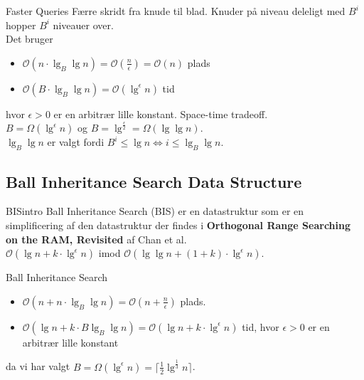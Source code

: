 \documentclass[pdf]{beamer}
\begin{document}
\begin{frame}{Faster Queries}
  Færre skridt fra knude til blad. Knuder på niveau deleligt med $B^i$ hopper $B^i$ niveauer over. \\

  Det bruger
  \begin{itemize}
    \item $\mathcal{O}(n \cdot \lg_B \lg n) = \mathcal{O}(\frac{n}{\epsilon}) = \mathcal{O}(n)$ plads
    \item $\mathcal{O}(B \cdot \lg_B \lg n) = \mathcal{O}(\lg^\epsilon n)$ tid
  \end{itemize}
  hvor $\epsilon > 0$ er en arbitrær lille konstant. Space-time tradeoff.\\

  \pause
  $B = \Omega(\lg^\epsilon n)$ og $B = \lg^\frac{\epsilon}{2} = \Omega(\lg \lg n)$.\\

  $\lg_B \lg n$ er valgt fordi $B^i \leq \lg n \Leftrightarrow i \leq \lg_B \lg n$.
\end{frame}

\subsection{Ball Inheritance Search Data Structure}

\begin{frame}{BISintro}
  Ball Inheritance Search (BIS) er en datastruktur som er en simplificering af den datastruktur der findes i \textbf{Orthogonal Range Searching on the RAM, Revisited}\cite{chanetal} af Chan et al.\\

  $\mathcal{O}(\lg n + k\cdot\lg^\epsilon n)$ imod $\mathcal{O}(\lg \lg n + (1+k)\cdot\lg^\epsilon n)$.

\end{frame}


\begin{frame}{Ball Inheritance Search}

  \begin{itemize}
    \item $\mathcal{O}(n + n\cdot\lg_B\lg n) = \mathcal{O}(n + \frac{n}{\epsilon})$ plads.
    \item $\mathcal{O}(\lg n + k\cdot B\lg_B\lg n) = \mathcal{O}(\lg n + k\cdot\lg^\epsilon n)$ tid, hvor $\epsilon > 0$ er en arbitrær lille konstant
  \end{itemize}
    da vi har valgt $B = \Omega(\lg^\epsilon n) = \lceil \frac{1}{2}\lg^\frac{1}{3} n \rceil$.
\end{frame}
\end{document}
